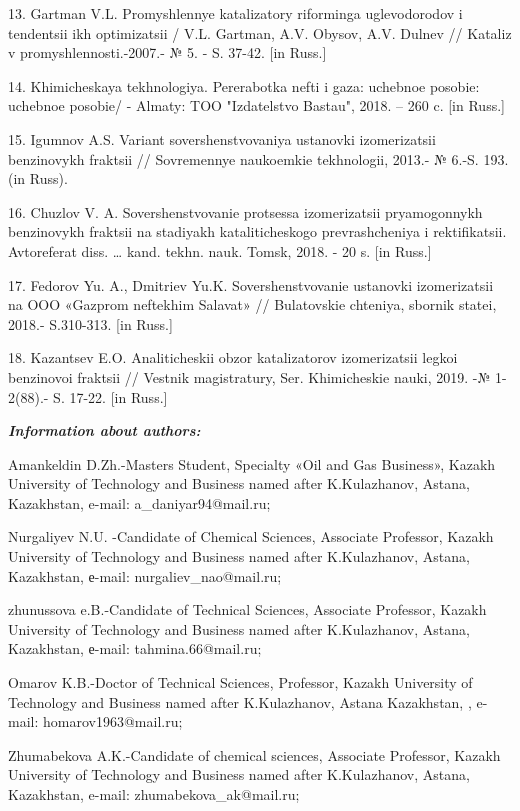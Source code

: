 13. Gartman V.L. Promyshlennye katalizatory riforminga uglevodorodov i
tendentsii ikh optimizatsii / V.L. Gartman, A.V. Obysov, A.V.
Dul\textquotesingle nev // Kataliz v promyshlennosti.-2007.- № 5. - S.
37-42. {[}in Russ.{]}

14. Khimicheskaya tekhnologiya. Pererabotka nefti i gaza: uchebnoe
posobie: uchebnoe posobie/ - Almaty: TOO "Izdatel\textquotesingle stvo
Bastau", 2018. -- 260 c. {[}in Russ.{]}

15. Igumnov A.S. Variant sovershenstvovaniya ustanovki izomerizatsii
benzinovykh fraktsii // Sovremennye naukoemkie tekhnologii, 2013.- №
6.-S. 193. (in Russ).

16. Chuzlov V. A. Sovershenstvovanie protsessa izomerizatsii
pryamogonnykh benzinovykh fraktsii na stadiyakh kataliticheskogo
prevrashcheniya i rektifikatsii. Avtoreferat diss. \ldots{} kand. tekhn.
nauk. Tomsk, 2018. - 20 s. {[}in Russ.{]}

17. Fedorov Yu. A., Dmitriev Yu.K. Sovershenstvovanie ustanovki
izomerizatsii na OOO «Gazprom neftekhim Salavat» // Bulatovskie
chteniya, sbornik statei, 2018.- S.310-313. {[}in Russ.{]}

18. Kazantsev E.O. Analiticheskii obzor katalizatorov izomerizatsii
legkoi benzinovoi fraktsii // Vestnik magistratury, Ser. Khimicheskie
nauki, 2019. -№ 1-2(88).- S. 17-22. {[}in Russ.{]}

\emph{{\bfseries Information about authors:}}

Amankeldin D.Zh.-Master\textquotesingle s Student, Specialty «Oil and
Gas Business», Kazakh University of Technology and Business named after
K.Kulazhanov, Astana, Kazakhstan, e-mail: a\_daniyar94@mail.ru;

Nurgaliyev N.U. -Candidate of Chemical Sciences, Associate Professor,
Kazakh University of Technology and Business named after K.Kulazhanov,
Astana, Kazakhstan, е-mail: nurgaliev\_nao@mail.ru;

zhunussova e.B.-Candidate of Technical Sciences, Associate Professor,
Kazakh University of Technology and Business named after K.Kulazhanov,
Astana, Kazakhstan, е-mail: tahmina.66@mail.ru;

Omarov K.B.-Doctor of Technical Sciences, Professor, Kazakh University
of Technology and Business named after K.Kulazhanov, Astana Kazakhstan,
, e-mail: homarov1963@mail.ru;

Zhumabekova A.K.-Candidate of chemical sciences, Associate Professor,
Kazakh University of Technology and Business named after K.Kulazhanov,
Astana, Kazakhstan, e-mail: zhumabekova\_ak@mail.ru;

